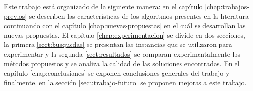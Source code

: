 Este trabajo está organizado de la siguiente manera: en el capítulo \autoref{chap:trabajos-previos} se describen las características de los algoritmos presentes en la literatura continuando con el capítulo \autoref{chap:nuevas-propuestas} en el cuál se desarrollan las nuevas propuestas. El capítulo \autoref{chap:experimentacion} se divide en dos secciones, la primera \autoref{sect:busquedas} se presentan las instancias que se utilizaron para experimentar y la segunda \autoref{sect:resultados} se comparan experimentalmente los métodos propuestos y se analiza la calidad de las soluciones encontradas. En el capítulo  \autoref{chap:conclusiones} se exponen conclusiones generales del trabajo y finalmente, en la sección \autoref{sect:trabajo-futuro} se proponen mejoras a este trabajo.
